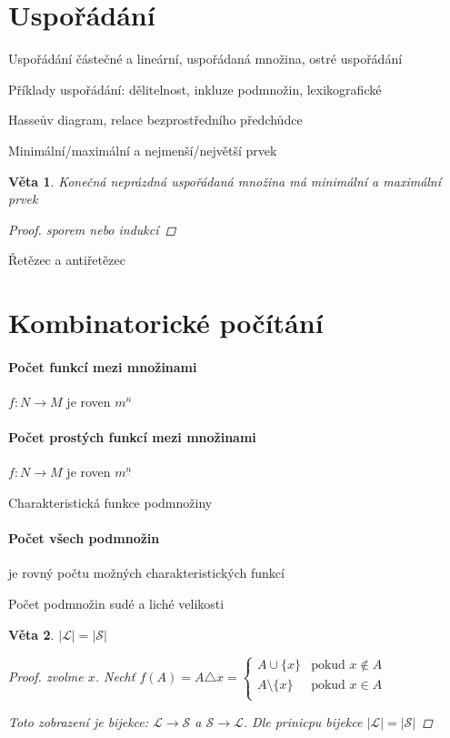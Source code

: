 \documentclass[10pt,a4paper]{article}
\theoremstyle{plain}
\newtheorem{veta}{Věta}
\theoremstyle{definition}
\begin{document}
\section{Uspořádání}

Uspořádání částečné a lineární, uspořádaná množina, ostré uspořádání

Příklady uspořádání: dělitelnost, inkluze podmnožin, lexikografické

Hasseův diagram, relace bezprostředního předchůdce

Minimální/maximální a nejmenší/největší prvek

\begin{veta}
Konečná neprázdná uspořádaná množina má minimální a maximální prvek
\begin{proof}
sporem nebo indukcí
\end{proof}
\end{veta}

Řetězec a antiřetězec

\section{Kombinatorické počítání}

\paragraph{Počet funkcí mezi množinami} $f: N \to M$ je roven $m^n$

\paragraph{Počet prostých funkcí mezi množinami} $f: N \to M$ je roven $m^{\underline{n}}$

Charakteristická funkce podmnožiny

\paragraph{Počet všech podmnožin} je rovný počtu možných charakteristických funkcí

Počet podmnožin sudé a liché velikosti
\begin{veta}
$ |\mathcal{L}| = |\mathcal{S}| $
\begin{proof}
zvolme $x$. Nechť $f(A) = A \triangle {x} =
\begin{cases} 
A \cup \{x\}  	   & \text{pokud } x \notin A \\ 
A \setminus \{x\} & \text{pokud } x \in A  \\
\end{cases}$

Toto zobrazení je bijekce: $\mathcal{L} \to \mathcal{S}$ a $\mathcal{S} \to \mathcal{L}$. Dle prinicpu bijekce $|\mathcal{L}| = |\mathcal{S}|$
\end{proof}
\end{veta}
\end{document}
